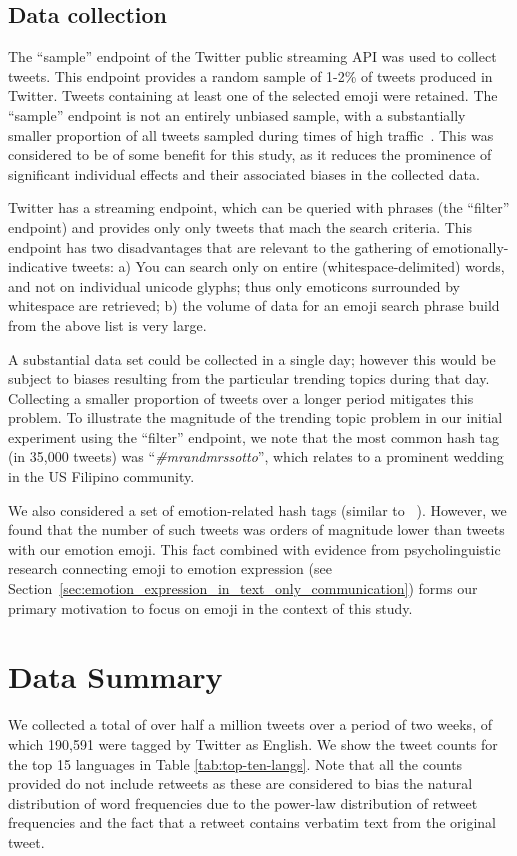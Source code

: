 \documentclass[10pt, a4paper]{article}
\begin{document}
\subsection{Data collection}

The ``sample'' endpoint of the Twitter public streaming API was used to collect tweets. This endpoint provides a random sample of 1-2\% of tweets produced in Twitter.
Tweets containing at least one of the selected emoji were retained. The ``sample'' endpoint is not an entirely unbiased sample, with a substantially smaller proportion of all tweets sampled during times of high traffic~\cite{Morstatter2013Is}. This was considered to be of some benefit for this study, as it reduces the prominence of significant individual effects and their associated biases in the collected data.

Twitter has a streaming endpoint, which can be queried with phrases (the ``filter'' endpoint) and provides only only tweets that mach the search criteria.
This endpoint has two disadvantages that are relevant to the gathering of emotionally-indicative tweets: a) You can search only on entire (whitespace-delimited) words, and not on individual unicode glyphs; thus only emoticons surrounded by whitespace are retrieved; b) the volume of data for an emoji search phrase build from the above list is very large.

A substantial data set could be collected in a single day; however this would be subject to biases resulting from the particular trending topics during that day. 
Collecting a smaller proportion of tweets over a longer period mitigates this problem.
To illustrate the magnitude of the trending topic problem in our initial experiment using the ``filter'' endpoint, we note that the most common hash tag (in 35,000 tweets) was ``\emph{\#mrandmrssotto}'', which relates to a prominent wedding in the US Filipino community.

We also considered a set of emotion-related hash tags (similar to ~\cite{Mohammad2012Emotional}). However, we found that the number of such tweets was orders of magnitude lower than tweets with our emotion emoji. This fact combined with evidence from psycholinguistic research connecting emoji to emotion expression (see Section~\ref{sec:emotion_expression_in_text_only_communication}) forms our primary motivation to focus on emoji in the context of this study.

\section{Data Summary}
We collected a total of over half a million tweets over a period of two weeks, of which 190,591 were tagged by Twitter as English. We show the tweet counts for the top 15 languages in Table \ref{tab:top-ten-langs}.
Note that all the counts provided do not include retweets as 
these are considered to bias the natural distribution of word frequencies due to the power-law distribution of retweet frequencies and the fact that a retweet contains verbatim text from the original tweet.
\end{document}
